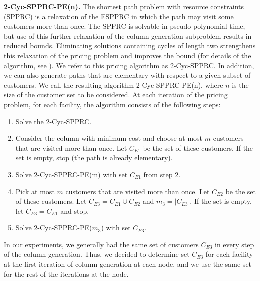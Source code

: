 \documentclass[graybox]{./styles/svmult}
\begin{document}
{\bf 2-Cyc-SPPRC-PE(n).} The shortest path problem with resource
constraints (SPPRC) is a relaxation of the ESPPRC in which the path
may visit some customers more than once.
The SPPRC is solvable in pseudo-polynomial time, but use of this
further relaxation of the column generation subproblem results in
reduced bounds. Eliminating solutions containing cycles of length two
strengthens this relaxation of the pricing problem and improves the
bound (for details of the algorithm, see
\citet{IrnichDesaulniers2005}). We refer to this
pricing algorithm as 2-Cyc-SPPRC. In addition, we can also generate
paths that are elementary with respect to a given subset of customers.
We call the resulting algorithm 2-Cyc-SPPRC-PE(n), where $n$ is the
size of the customer set to be considered.
At each iteration of the pricing problem, for each
facility, the algorithm consists of the following steps:
\begin{enumerate}
\item Solve the 2-Cyc-SPPRC.  
\item Consider the column with minimum cost and choose at most $m$
customers that are visited more than once. Let $C_{E1}$ be the set of
these customers. If the set is empty, stop (the path is already
elementary).
\item Solve 2-Cyc-SPPRC-PE(m) with set $C_{E1}$ from step 2. 
\item Pick at most $m$ customers that are visited more than once. Let $C_{E2}$
be the set of these customers. Let $C_{E3} = C_{E1}\cup C_{E2}$ and $m_3 =
|C_{E3}|$. If the set is empty, let $C_{E3} = C_{E1}$ and stop.
\item Solve  2-Cyc-SPPRC-PE($m_3$) with set $C_{E3}$.
\end{enumerate} 
In our experiments, we generally had the same set of customers
$C_{E3}$ in every step of the column generation. Thus, we decided to
determine set $C_{E3}$ for each facility at the first iteration of
column generation at each node, and we use the same set for the rest
of the iterations at the node.
  
\end{document}
